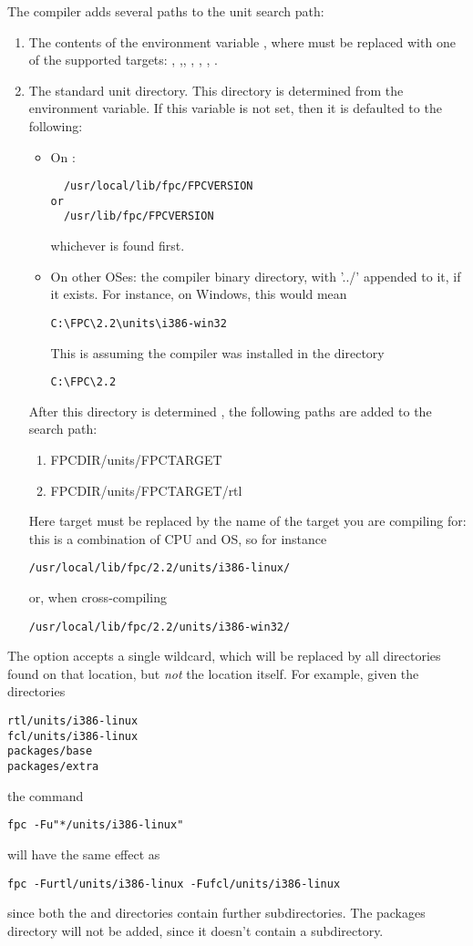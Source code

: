 The compiler adds several paths to the unit search path:
\begin{enumerate}
\item The contents of the environment variable , where 
must be replaced with one of the supported targets: ,
,, , , , .
\item The standard unit directory. This directory is determined
from the  environment variable. If this variable is not set,
then it is defaulted to the following:
\begin{itemize}
\item On \linux:
\begin{verbatim}
  /usr/local/lib/fpc/FPCVERSION
or
  /usr/lib/fpc/FPCVERSION
\end{verbatim}
whichever is found first.
\item On other OSes: the compiler binary directory, with '../' appended
to it, if it exists. For instance, on Windows, this would mean
\begin{verbatim}
C:\FPC\2.2\units\i386-win32
\end{verbatim}
This is assuming the compiler was installed in the directory
\begin{verbatim}
C:\FPC\2.2
\end{verbatim}
\end{itemize}
After this directory is determined , the following paths are added to the
search path:
\begin{enumerate}
\item FPCDIR/units/FPCTARGET
\item FPCDIR/units/FPCTARGET/rtl
\end{enumerate}
Here target must be replaced by the name of the target you are compiling
for: this is a combination of CPU and OS, so for instance
\begin{verbatim}
/usr/local/lib/fpc/2.2/units/i386-linux/
\end{verbatim}
or, when cross-compiling
\begin{verbatim}
/usr/local/lib/fpc/2.2/units/i386-win32/
\end{verbatim}
\end{enumerate}

The  option accepts a single \var{*} wildcard, which will be
replaced by all directories found on that location, but {\em not} the
location itself.
For example, given the directories
\begin{verbatim}
rtl/units/i386-linux
fcl/units/i386-linux
packages/base
packages/extra
\end{verbatim}
the command
\begin{verbatim}
fpc -Fu"*/units/i386-linux"
\end{verbatim}
will have the same effect as
\begin{verbatim}
fpc -Furtl/units/i386-linux -Fufcl/units/i386-linux
\end{verbatim}
since both the  and  directories contain further
 subdirectories. The packages directory will not be
added, since it doesn't contain a  subdirectory.

